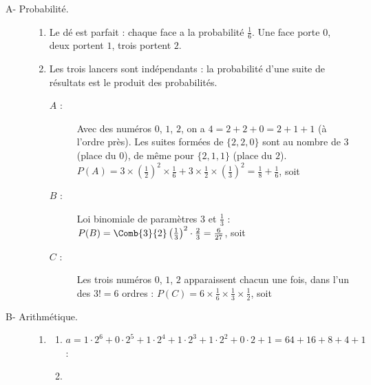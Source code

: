 \begin{description}
	\item[A- Probabilité.]
	\begin{enumerate}
		\item {}
			Le dé est parfait : chaque face a la probabilité $\frac{1}{6}$. Une face porte $0$, deux portent $1$, trois portent $2$.
			\par\noindent{}
		\item Les trois lancers sont indépendants : la probabilité d'une suite de résultats est le produit des probabilités.
		\begin{description}
			\item[$A$ :] 
				Avec des numéros $0$, $1$, $2$, on a $4 = 2 + 2 + 0 = 2 + 1 + 1$ (à l'ordre près).
				Les suites formées de $\{2,2,0\}$ sont au nombre de $3$ (place du $0$), de même pour $\{2,1,1\}$ (place du $2$).
				$P(A) = 3 \times \left(\frac{1}{2}\right)^2 \times \frac{1}{6} + 3 \times \frac{1}{2} \times \left(\frac{1}{3}\right)^2 = \frac{1}{8} + \frac{1}{6}$,
				soit \par\noindent{}
			\item[$B$ :] 
				Loi binomiale de paramètres $3$ et $\frac{1}{3}$ : $P(B) = \Comb{3}{2}\left(\frac{1}{3}\right)^2 \cdot \frac{2}{3} = \frac{6}{27}$,
				soit \par\noindent{}
			\item[$C$ :] 
				Les trois numéros $0$, $1$, $2$ apparaissent chacun une fois, dans l'un des $3! = 6$ ordres :
				$P(C) = 6 \times \frac{1}{6} \times \frac{1}{3} \times \frac{1}{2}$, soit \par\noindent{}
		\end{description}
	\end{enumerate}
	\item[B- Arithmétique.]
	\begin{enumerate}
		\item
		\begin{enumerate}
			\item {}
				$a = 1 \cdot 2^6 + 0 \cdot 2^5 + 1 \cdot 2^4 + 1 \cdot 2^3 + 1 \cdot 2^2 + 0 \cdot 2 + 1 = 64 + 16 + 8 + 4 + 1$ : \par\noindent{}
			\item {}

\end{enumerate}
\end{enumerate}
\end{description}

